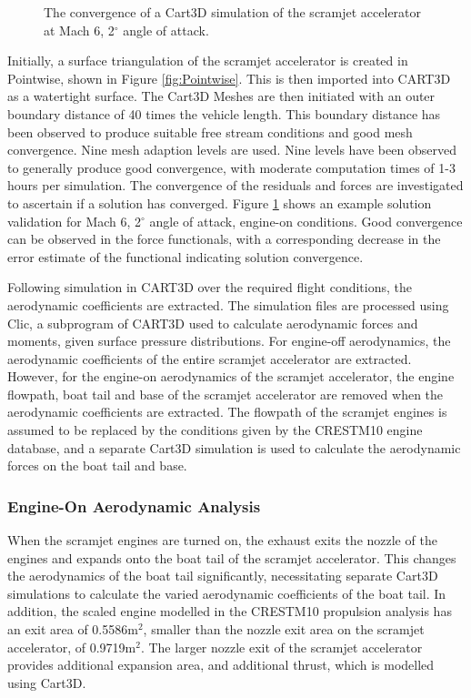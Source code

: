\begin{figure}[ht]
\begin{subfigure}{.5\textwidth}
	\end{subfigure}
	
	\caption{The convergence of a Cart3D simulation of the scramjet accelerator at Mach 6, 2$^\circ$ angle of attack.}
	\label{fig:Cart3dValidation}
\end{figure}

Initially, a surface triangulation of the scramjet accelerator is created in Pointwise, shown in Figure \ref{fig:Pointwise}. This is then imported into CART3D as a watertight surface. 
The Cart3D Meshes are then initiated with an outer boundary distance of 40 times the vehicle length. This boundary distance has been observed to produce suitable free stream conditions and good mesh convergence. Nine mesh adaption levels are used. Nine levels have been observed to generally produce good convergence, with moderate computation times of 1-3 hours per simulation. The convergence of the residuals and forces are investigated to ascertain if a solution has converged. Figure \ref{fig:Cart3dValidation} shows an example solution validation for Mach 6, 2$^\circ$ angle of attack, engine-on conditions. Good convergence can be observed in the force functionals, with a corresponding decrease in the error estimate of the functional indicating solution convergence.  

Following simulation in CART3D over the required flight conditions, the aerodynamic coefficients are extracted. The simulation files are processed using Clic, a subprogram of CART3D used to calculate aerodynamic forces and moments, given surface pressure distributions. 
For engine-off aerodynamics, the aerodynamic coefficients of the entire scramjet accelerator are extracted. However, for the engine-on aerodynamics of the scramjet accelerator, the engine flowpath, boat tail and base of the scramjet accelerator are removed when the aerodynamic coefficients are extracted. The flowpath of the scramjet engines is assumed to be replaced by the conditions given by the \textsf{CRESTM10} engine database, and a separate Cart3D simulation is used to calculate the aerodynamic forces on the boat tail and base. 



\subsubsection{Engine-On Aerodynamic Analysis}\label{sec:engine-oncart}

When the scramjet engines are turned on, the exhaust exits the nozzle of the engines and expands onto the boat tail of the scramjet accelerator. This changes the aerodynamics of the boat tail significantly, necessitating separate Cart3D simulations to calculate the varied aerodynamic coefficients of the boat tail. In addition, 
the scaled engine modelled in the \textsf{CRESTM10} propulsion analysis has an exit area of 0.5586m$^2$, smaller than the nozzle exit area on the scramjet accelerator, of 0.9719m$^2$. The larger nozzle exit of the scramjet accelerator provides additional expansion area, and additional thrust, which is modelled using Cart3D. 


